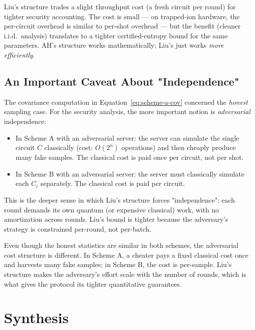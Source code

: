 \documentclass[11pt]{article}
\theoremstyle{plain}
\theoremstyle{definition}
\begin{document}
\begin{intuition}
Liu's structure trades a slight throughput cost (a fresh circuit per round) for tighter security accounting. The cost is small --- on trapped-ion hardware, the per-circuit overhead is similar to per-shot overhead --- but the benefit (cleaner i.i.d.\ analysis) translates to a tighter certified-entropy bound for the same parameters. AH's structure works mathematically; Liu's just works \emph{more efficiently}.
\end{intuition}

\subsection{An Important Caveat About "Independence"}

The covariance computation in Equation~\eqref{eq:scheme-a-cov} concerned the \emph{honest} sampling case. For the security analysis, the more important notion is \emph{adversarial} independence:

\begin{itemize}[leftmargin=2em, itemsep=4pt]
\item In Scheme A with an adversarial server: the server can simulate the single circuit $C$ classically (cost: $O(2^n)$ operations) and then cheaply produce many fake samples. The classical cost is paid once per circuit, not per shot.
\item In Scheme B with an adversarial server: the server must classically simulate each $C_i$ separately. The classical cost is paid per circuit.
\end{itemize}

This is the deeper sense in which Liu's structure forces "independence": each round demands its own quantum (or expensive classical) work, with no amortization across rounds. Liu's bound is tighter because the adversary's strategy is constrained per-round, not per-batch.

\begin{intuition}
Even though the honest statistics are similar in both schemes, the adversarial cost structure is different. In Scheme A, a cheater pays a fixed classical cost once and harvests many fake samples; in Scheme B, the cost is per-sample. Liu's structure makes the adversary's effort scale with the number of rounds, which is what gives the protocol its tighter quantitative guarantees.
\end{intuition}

\section{Synthesis}
\end{document}
